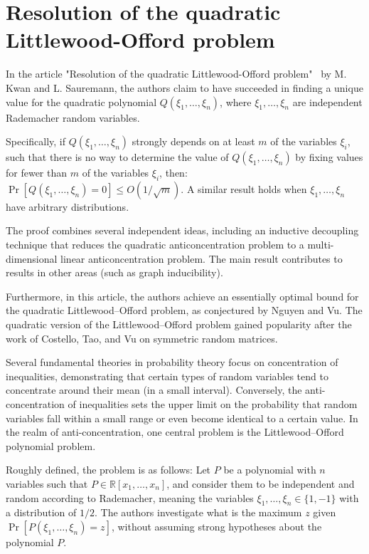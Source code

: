 \section{Resolution of the quadratic Littlewood-Offord problem}


In the article "Resolution of the quadratic Littlewood-Offord problem"~\cite{kwan2023resolution} by M. Kwan and L. Sauremann, the authors claim to have succeeded in finding a unique value for the quadratic polynomial $Q(\xi_1,\ldots,\xi_n)$, where $\xi_1,\ldots,\xi_n$ are independent Rademacher random variables.
 
Specifically, if $Q(\xi_1,\ldots,\xi_n)$ strongly depends on at least $m$ of the variables $\xi_i$, such that there is no way to determine the value of $Q(\xi_1,\ldots,\xi_n)$ by fixing values for fewer than $m$ of the variables $\xi_i$, then:
$\Pr[Q(\xi_1,\ldots,\xi_n) = 0] \leq O(1/\sqrt{m})$. A similar result holds when $\xi_1,\ldots,\xi_n$ have arbitrary distributions.
 
The proof combines several independent ideas, including an inductive decoupling technique that reduces the quadratic anticoncentration problem to a multi-dimensional linear anticoncentration problem.
\newline
The main result contributes to results in other areas (such as graph inducibility).
 
Furthermore, in this article, the authors achieve an essentially optimal bound for the quadratic Littlewood–Offord problem, as conjectured by Nguyen and Vu. The quadratic version of the Littlewood–Offord problem gained popularity after the work of Costello, Tao, and Vu on symmetric random matrices.
 
Several fundamental theories in probability theory focus on concentration of inequalities, demonstrating that certain types of random variables tend to concentrate around their mean (in a small interval). Conversely, the anti-concentration of inequalities sets the upper limit on the probability that random variables fall within a small range or even become identical to a certain value. In the realm of anti-concentration, one central problem is the Littlewood–Offord polynomial problem.
 
Roughly defined, the problem is as follows: Let $P$ be a polynomial with $n$ variables such that $P \in \mathbb{R}[x_1,\ldots,x_n]$, and consider them to be independent and random according to Rademacher, meaning the variables $\xi_1,\ldots,\xi_n \in \{1,-1\}$ with a distribution of $1/2$. The authors investigate what is the maximum $z$ given $\Pr[P(\xi_1,\ldots,\xi_n) = z]$, without assuming strong hypotheses about the polynomial $P$.
 
